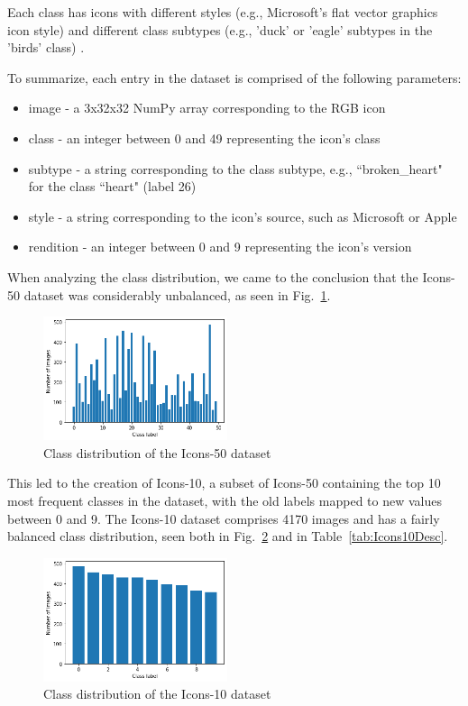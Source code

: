 \documentclass[conference]{IEEEtran}
\begin{document}
Each class has icons with different styles (e.g., Microsoft's flat vector graphics icon style) and different class subtypes (e.g., 'duck' or 'eagle' subtypes in the 'birds' class) \cite{Icons50}.

To summarize, each entry in the dataset is comprised of the following parameters:
\begin{itemize}
    \item image - a 3x32x32 NumPy array corresponding to the RGB icon
    \item class - an integer between 0 and 49 representing the icon's class
    \item subtype - a string corresponding to the class subtype, e.g., ``broken\_heart" for the class ``heart" (label 26)
    \item style - a string corresponding to the icon's source, such as Microsoft or Apple
    \item rendition - an integer between 0 and 9 representing the icon's version
\end{itemize}

When analyzing the class distribution, we came to the conclusion that the Icons-50 dataset was considerably unbalanced, as seen in Fig.~\ref{fig:Icons50ClassDist}.

\begin{figure}[htbp]
    \centering
    \includegraphics[width=0.48\textwidth]{paper/images/icons50/class_dist.png}
    \caption{Class distribution of the Icons-50 dataset}
    \label{fig:Icons50ClassDist}
\end{figure}

This led to the creation of Icons-10, a subset of Icons-50 containing the top 10 most frequent classes in the dataset, with the old labels mapped to new values between 0 and 9. The Icons-10 dataset comprises 4170 images and has a fairly balanced class distribution, seen both in Fig.~\ref{fig:Icons10ClassDist} and in Table~\ref{tab:Icons10Desc}.

\begin{figure}[htbp]
    \centering
    \includegraphics[width=0.48\textwidth]{paper/images/icons10/class_dist.png}
    \caption{Class distribution of the Icons-10 dataset}
    \label{fig:Icons10ClassDist}
\end{figure}
\end{document}
